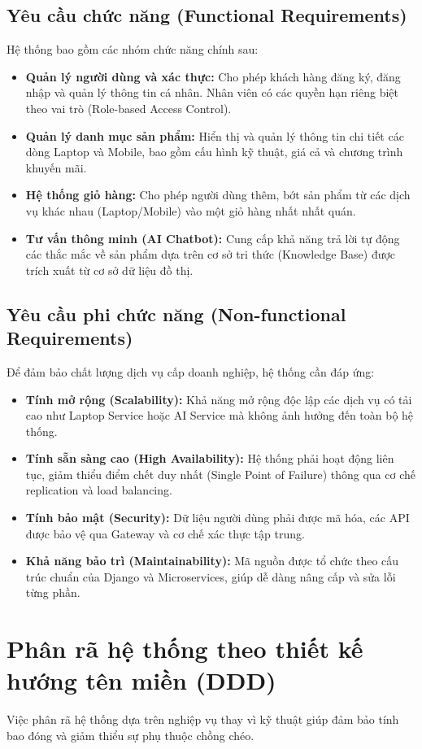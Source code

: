 \documentclass[12pt,a4paper]{report}
\begin{document}
\subsection{Yêu cầu chức năng (Functional Requirements)}
Hệ thống bao gồm các nhóm chức năng chính sau:
\begin{itemize}
    \item \textbf{Quản lý người dùng và xác thực:} Cho phép khách hàng đăng ký, đăng nhập và quản lý thông tin cá nhân. Nhân viên có các quyền hạn riêng biệt theo vai trò (Role-based Access Control).
    \item \textbf{Quản lý danh mục sản phẩm:} Hiển thị và quản lý thông tin chi tiết các dòng Laptop và Mobile, bao gồm cấu hình kỹ thuật, giá cả và chương trình khuyến mãi.
    \item \textbf{Hệ thống giỏ hàng:} Cho phép người dùng thêm, bớt sản phẩm từ các dịch vụ khác nhau (Laptop/Mobile) vào một giỏ hàng nhất nhất quán.
    \item \textbf{Tư vấn thông minh (AI Chatbot):} Cung cấp khả năng trả lời tự động các thắc mắc về sản phẩm dựa trên cơ sở tri thức (Knowledge Base) được trích xuất từ cơ sở dữ liệu đồ thị.
\end{itemize}

\subsection{Yêu cầu phi chức năng (Non-functional Requirements)}
Để đảm bảo chất lượng dịch vụ cấp doanh nghiệp, hệ thống cần đáp ứng:
\begin{itemize}
    \item \textbf{Tính mở rộng (Scalability):} Khả năng mở rộng độc lập các dịch vụ có tải cao như Laptop Service hoặc AI Service mà không ảnh hưởng đến toàn bộ hệ thống.
    \item \textbf{Tính sẵn sàng cao (High Availability):} Hệ thống phải hoạt động liên tục, giảm thiểu điểm chết duy nhất (Single Point of Failure) thông qua cơ chế replication và load balancing.
    \item \textbf{Tính bảo mật (Security):} Dữ liệu người dùng phải được mã hóa, các API được bảo vệ qua Gateway và cơ chế xác thực tập trung.
    \item \textbf{Khả năng bảo trì (Maintainability):} Mã nguồn được tổ chức theo cấu trúc chuẩn của Django và Microservices, giúp dễ dàng nâng cấp và sửa lỗi từng phần.
\end{itemize}

\section{Phân rã hệ thống theo thiết kế hướng tên miền (DDD)}
Việc phân rã hệ thống dựa trên nghiệp vụ thay vì kỹ thuật giúp đảm bảo tính bao đóng và giảm thiểu sự phụ thuộc chồng chéo.
\end{document}
